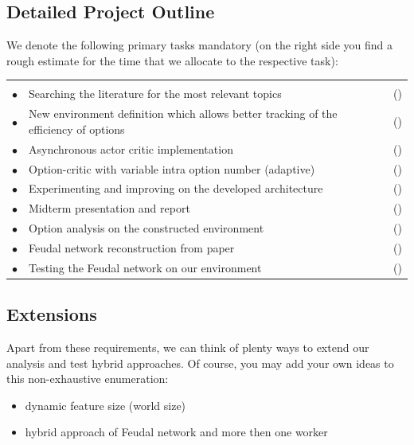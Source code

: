 \documentclass[a4paper,11pt]{article}
\newenvironment{reqlist}{\par \medskip \noindent \begin{tabular}{cp{0.83\textwidth}r} \\[-24pt]}{\end{tabular}}
\newcommand\req{\\ \smallskip \smallskip \hspace{0.24cm} $\bullet$\hspace{-0.2cm} & }
\newcounter{num}
\newcommand\effort[1]{\mbox{(\forloop{num}{0}{\value{num} < #1}{$\star$})}}
\begin{document}
\subsection*{Detailed Project Outline}
We denote the following primary tasks mandatory (on the right side you find a rough estimate for the time that we allocate to the respective task):
\begin{reqlist}
\req Searching the literature for the most relevant topics & \effort{3}
\req New environment definition which allows better tracking of the efficiency of options & \effort{2}
\req Asynchronous actor critic implementation & \effort{2}
\req Option-critic with variable intra option number (adaptive) & \effort{6}
\req Experimenting and improving on the developed architecture & \effort{3}
\req Midterm presentation and report & \effort{5}
\req Option analysis on the constructed environment & \effort{3}
\req Feudal network reconstruction from paper & \effort{5}
\req Testing the Feudal network on our environment & \effort{2}
\end{reqlist}

\subsection*{Extensions}
\noindent Apart from these requirements, we can think of plenty ways to extend our analysis and test hybrid approaches. Of course, you may add your own ideas to this non-exhaustive enumeration:
\begin{itemize}
	\item dynamic feature size (world size)
 	\item hybrid approach of Feudal network and more then one worker
 \end{itemize}
\end{document}
